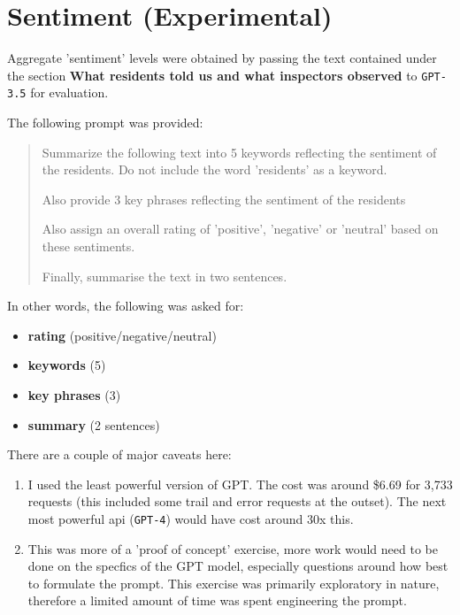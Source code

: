\documentclass[a4paper,11pt,twoside]{article}
\begin{document}
\section{Sentiment (Experimental)}
\label{sec:org25618f9}

Aggregate 'sentiment' levels were obtained by passing the text contained under the section \textbf{\textbf{What residents told us and what inspectors observed}} to \texttt{GPT-3.5} for evaluation.

The following prompt was provided:

\begin{quote}
Summarize the following text into 5 keywords reflecting the sentiment of the residents. Do not include the word 'residents' as a keyword.

Also provide 3 key phrases reflecting the sentiment of the residents

Also assign an overall rating of 'positive', 'negative' or 'neutral' based on these sentiments.

Finally, summarise the text in two sentences.
\end{quote}

In other words, the following was asked for:

\begin{itemize}
\item \textbf{\textbf{rating}} (positive/negative/neutral)
\item \textbf{\textbf{keywords}} (5)
\item \textbf{\textbf{key phrases}} (3)
\item \textbf{\textbf{summary}} (2 sentences)
\end{itemize}

There are a couple of major caveats here:

\begin{enumerate}
\item I used the least powerful version of GPT. The cost was around \$6.69 for 3,733 requests (this included some trail and error requests at the outset). The next most powerful api (\texttt{GPT-4}) would have cost around 30x this.
\item This was more of a 'proof of concept' exercise, more work would need to be done on the specfics of the GPT model, especially questions around how best to formulate the prompt. This exercise was primarily exploratory in nature, therefore a limited amount of time was spent engineering the prompt.
\end{enumerate}
\end{document}
